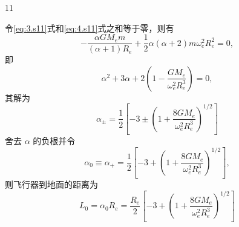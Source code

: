 \begin{solution}{11}
\begin{subsolution}
令\eqref{eq:3.s11}式和\eqref{eq:4.s11}式之和等于零，则有
\begin{equation*}
- \frac {\alpha G M _ {e} m}{(\alpha + 1) R _ {e}} + \frac {1}{2} \alpha (\alpha + 2) m \omega_ {e} ^ {2} R _ {e} ^ {2} = 0,
\end{equation*}
即
\begin{equation}
\alpha^ {2} + 3 \alpha + 2 \left(1 - \frac {G M _ {e}}{\omega_ {e} ^ {2} R _ {e} ^ {3}}\right) = 0,
\label{eq:9.s11}
\end{equation}
其解为
\begin{equation}
\alpha_ {\pm} = \frac {1}{2} \left[ - 3 \pm \left(1 + \frac {8 G M _ {e}}{\omega_ {e} ^ {2} R _ {e} ^ {3}}\right) ^ {1 / 2} \right]
\label{eq:10.s11}
\end{equation}
舍去 $\alpha$ 的负根并令
\begin{equation}
\alpha_ {0} \equiv \alpha_ {+} = \frac {1}{2} \left[ - 3 + \left(1 + \frac {8 G M _ {e}}{\omega_ {e} ^ {2} R _ {e} ^ {3}}\right) ^ {1 / 2} \right],
\label{eq:11.s11}
\end{equation}
则飞行器到地面的距离为
\begin{equation}
L _ {0} = \alpha_ {0} R _ {e} = \frac {R _ {e}}{2} \left[ - 3 + \left(1 + \frac {8 G M _ {e}}{\omega_ {e} ^ {2} R _ {e} ^ {3}}\right) ^ {1 / 2} \right]
\label{eq:12.s11}
\end{equation}
\end{subsolution}


\end{solution}
